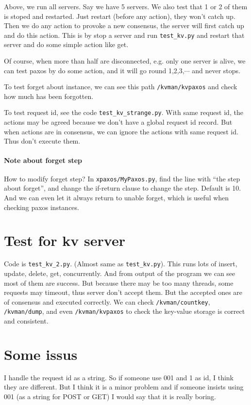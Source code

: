 \documentclass{article}
\begin{document}
Above, we run all servers. Say we have 5 servers. We also test that 1 or 2 of them is stoped and restarted. Just restart (before any action), they won't catch up. Then we do any action to provoke a new consensus, the server will first catch up and do this action. This is by stop a server and run \verb|test_kv.py| and restart that server and do some simple action like get.

Of course, when more than half are disconnected, e.g. only one server is alive, we can test paxos by do some action, and it will go round 1,2,3,$\cdots$ and never stops.

To test forget about instance, we can see this path {\tt /kvman/kvpaxos} and check how much has been forgotten.

To test request id, see the code \verb|test_kv_strange.py|. With same request id, the actions may be agreed because we don't have a global request id record. But when actions are in consensus, we can ignore the actions with same request id. Thus don't execute them.

\paragraph{Note about forget step} How to modify forget step? In {\tt xpaxos/MyPaxos.py}, find the line with ``the step about forget'', and change the if-return clause to change the step. Default is 10. And we can even let it always return to unable forget, which is useful when checking paxos instances.

\section{Test for kv server}

Code is \verb|test_kv_2.py|. (Almost same as \verb|test_kv.py|). This runs lots of insert, update, delete, get, concurrently. And from output of the program we can see most of them are success. But because there may be too many threads, some requests may timeout, thus server don't accept them. But the accepted ones are of consensus and executed correctly. We can check {\tt /kvman/countkey}, {\tt /kvman/dump}, and even {\tt /kvman/kvpaxos} to check the key-value storage is correct and consistent.

\section{Some issus}
I handle the request id as a string. So if someone use 001 and 1 as id, I think they are different. But I think it is a minor problem and if someone insists using 001 (as a string for POST or GET) I would say that it is really boring.
\end{document}
